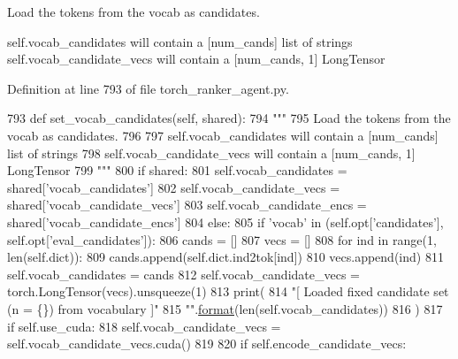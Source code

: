 \begin{DoxyVerb}Load the tokens from the vocab as candidates.

self.vocab_candidates will contain a [num_cands] list of strings
self.vocab_candidate_vecs will contain a [num_cands, 1] LongTensor
\end{DoxyVerb}
 

Definition at line 793 of file torch\+\_\+ranker\+\_\+agent.\+py.


\begin{DoxyCode}
793     \textcolor{keyword}{def }set\_vocab\_candidates(self, shared):
794         \textcolor{stringliteral}{"""}
795 \textcolor{stringliteral}{        Load the tokens from the vocab as candidates.}
796 \textcolor{stringliteral}{}
797 \textcolor{stringliteral}{        self.vocab\_candidates will contain a [num\_cands] list of strings}
798 \textcolor{stringliteral}{        self.vocab\_candidate\_vecs will contain a [num\_cands, 1] LongTensor}
799 \textcolor{stringliteral}{        """}
800         \textcolor{keywordflow}{if} shared:
801             self.vocab\_candidates = shared[\textcolor{stringliteral}{'vocab\_candidates'}]
802             self.vocab\_candidate\_vecs = shared[\textcolor{stringliteral}{'vocab\_candidate\_vecs'}]
803             self.vocab\_candidate\_encs = shared[\textcolor{stringliteral}{'vocab\_candidate\_encs'}]
804         \textcolor{keywordflow}{else}:
805             \textcolor{keywordflow}{if} \textcolor{stringliteral}{'vocab'} \textcolor{keywordflow}{in} (self.opt[\textcolor{stringliteral}{'candidates'}], self.opt[\textcolor{stringliteral}{'eval\_candidates'}]):
806                 cands = []
807                 vecs = []
808                 \textcolor{keywordflow}{for} ind \textcolor{keywordflow}{in} range(1, len(self.dict)):
809                     cands.append(self.dict.ind2tok[ind])
810                     vecs.append(ind)
811                 self.vocab\_candidates = cands
812                 self.vocab\_candidate\_vecs = torch.LongTensor(vecs).unsqueeze(1)
813                 print(
814                     \textcolor{stringliteral}{"[ Loaded fixed candidate set (n = \{\}) from vocabulary ]"}
815                     \textcolor{stringliteral}{""}.\hyperlink{namespaceparlai_1_1chat__service_1_1services_1_1messenger_1_1shared__utils_a32e2e2022b824fbaf80c747160b52a76}{format}(len(self.vocab\_candidates))
816                 )
817                 \textcolor{keywordflow}{if} self.use\_cuda:
818                     self.vocab\_candidate\_vecs = self.vocab\_candidate\_vecs.cuda()
819 
820                 \textcolor{keywordflow}{if} self.encode\_candidate\_vecs:

\end{DoxyCode}
